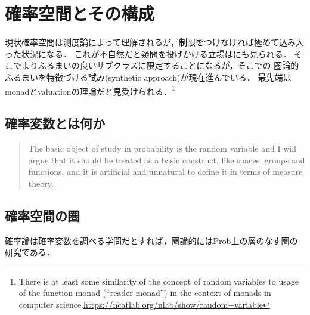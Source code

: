 \documentclass[uplatex,dvipdfmx]{jsreport}
\begin{document}
\section{確率空間とその構成}

\begin{tcolorbox}[colframe=ForestGreen, colback=ForestGreen!10!white,breakable,colbacktitle=ForestGreen!40!white,coltitle=black,fonttitle=\bfseries\sffamily,
    title=]
    現状確率空間は測度論によって理解されるが，制限をつけなければ極めて込み入った状況になる．
    これが不自然だと疑問を投げかける立場は\cite{Mumford00-DawnOfStochasticity}にも見られる．
    そこでよりふるまいの良いサブクラスに限定することになるが，そこでの
    圏論的ふるまいを特徴づける試み(synthetic approach)が現在進んでいる．
    最先端はmonadとvaluationの理論だと見受けられる．\footnote{There is at least some similarity of the concept of random variables to usage of the function monad (“reader monad”) in the context of monads in computer science.\url{https://ncatlab.org/nlab/show/random+variable}}
\end{tcolorbox}

\subsection{確率変数とは何か}

\begin{tcolorbox}[colframe=ForestGreen, colback=ForestGreen!10!white,breakable,colbacktitle=ForestGreen!40!white,coltitle=black,fonttitle=\bfseries\sffamily,
title=]
    \begin{quote}
        The basic object of study in probability is the random
        variable and I will argue that it should be treated as a
        basic construct, like spaces, groups and functions, and it
        is artificial and unnatural to define it in terms of measure
        theory. \cite{Mumford00-DawnOfStochasticity}
    \end{quote}
\end{tcolorbox}

\subsection{確率空間の圏}

\begin{tcolorbox}[colframe=ForestGreen, colback=ForestGreen!10!white,breakable,colbacktitle=ForestGreen!40!white,coltitle=black,fonttitle=\bfseries\sffamily,
title=]
    確率論は確率変数を調べる学問だとすれば，圏論的にはProb上の層のなす圏の研究である．
\end{tcolorbox}
\end{document}
